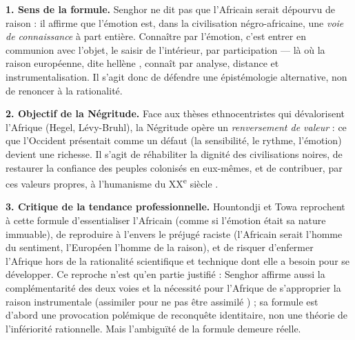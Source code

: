 \documentclass[11pt]{article}
\begin{document}
\begin{corrige}

\textbf{1. Sens de la formule.} Senghor ne dit pas que l'Africain serait dépourvu de raison : il affirme que l'émotion est, dans la civilisation négro-africaine, une \emph{voie de connaissance} à part entière. Connaître par l'émotion, c'est entrer en communion avec l'objet, le saisir de l'intérieur, par participation — là où la raison européenne, dite \guillemotleft hellène \guillemotright, connaît par analyse, distance et instrumentalisation. Il s'agit donc de défendre une épistémologie alternative, non de renoncer à la rationalité.

\textbf{2. Objectif de la Négritude.} Face aux thèses ethnocentristes qui dévalorisent l'Afrique (Hegel, Lévy-Bruhl), la Négritude opère un \emph{renversement de valeur} : ce que l'Occident présentait comme un défaut (la sensibilité, le rythme, l'émotion) devient une richesse. Il s'agit de réhabiliter la dignité des civilisations noires, de restaurer la confiance des peuples colonisés en eux-mêmes, et de contribuer, par ces valeurs propres, à l'\guillemotleft humanisme du XX\textsuperscript{e} siècle \guillemotright.

\textbf{3. Critique de la tendance professionnelle.} Hountondji et Towa reprochent à cette formule d'essentialiser l'Africain (comme si l'émotion était sa nature immuable), de reproduire à l'envers le préjugé raciste (l'Africain serait l'homme du sentiment, l'Européen l'homme de la raison), et de risquer d'enfermer l'Afrique hors de la rationalité scientifique et technique dont elle a besoin pour se développer. Ce reproche n'est qu'en partie justifié : Senghor affirme aussi la complémentarité des deux voies et la nécessité pour l'Afrique de s'approprier la raison instrumentale (\guillemotleft assimiler pour ne pas être assimilé \guillemotright) ; sa formule est d'abord une provocation polémique de reconquête identitaire, non une théorie de l'infériorité rationnelle. Mais l'ambiguïté de la formule demeure réelle.

\end{corrige}
\end{document}
